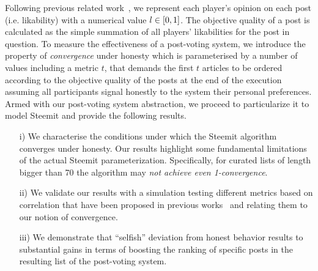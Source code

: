     Following previous related
    work~\cite{ghosh2011incentivizing,askalidis2013theoretical}, we represent
    each player's opinion on each post (i.e. likability) with a numerical value
    $l \in [ 0,1 ]$. The objective quality of a post is calculated as the
    simple summation of all players' likabilities for the post in question. To
    measure the effectiveness of a post-voting system, we introduce the property
    of \textit{convergence} under honesty which is parameterised by a number of
    values including a metric $t$, that demands the first $t$ articles to be
    ordered according to the objective quality of the posts at the end of the
    execution assuming all participants signal honestly to the system their
    personal preferences. Armed with our post-voting system abstraction, we
    proceed to particularize it to model Steemit and provide the following
    results.

    \begin{itemize}
      \item[i)] We characterise the conditions under which the Steemit algorithm
      converges under honesty. Our results highlight some fundamental
      limitations of the actual Steemit parameterization. Specifically, for
      curated lists of length bigger than 70 the algorithm may {\em not achieve
      even 1-convergence}.
      \item[ii)] We validate our results with a simulation testing different
      metrics based on correlation that have been proposed in previous
      works~\cite{kendall1955rank,spearman1904proof} and relating them to our
      notion of convergence.
      \item[iii)] We demonstrate that ``selfish'' deviation from honest behavior
      results to substantial gains in terms of boosting the ranking of specific
      posts in the resulting list of the post-voting system.
    \end{itemize}



